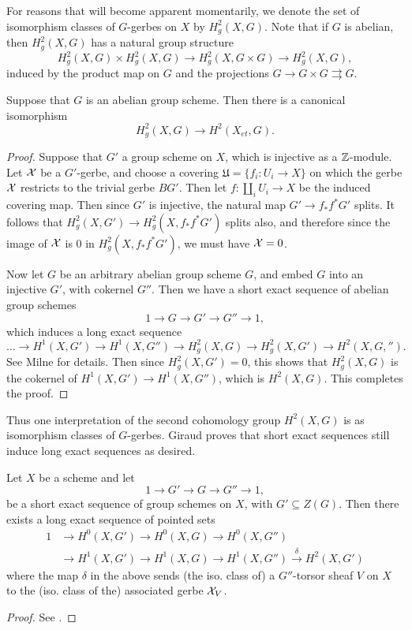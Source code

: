 For reasons that will become apparent momentarily, we denote the set of isomorphism classes of $G$-gerbes on $X$ by $H^2_g(X,G)$.  Note that if $G$ is abelian, then $H^2_g(X,G)$ has a natural group structure
$$H_g^2(X,G)\times H_g^2(X,G)\rightarrow H_g^2(X,G\times G)\rightarrow H_g^2(X,G),$$
induced by the product map on $G$ and the projections $G\rightarrow G\times G\rightrightarrows G$.
\begin{prop}
Suppose that $G$ is an abelian group scheme.  Then there is a canonical isomorphism
$$H^2_g(X,G)\rightarrow H^2(X_{et},G).$$
\end{prop}
\begin{proof}
Suppose that $G'$ a group scheme on $X$, which is injective as a $\mathbb{Z}$-module.  Let $\mathcal{X}$ be a $G'$-gerbe, and choose a covering $\mathfrak U=\{f_i: U_i\rightarrow X\}$ on which the gerbe $\mathcal{X}$ restricts to the trivial gerbe $BG'$.  Then let $f: \amalg_i U_i\rightarrow X$ be the induced covering map.  Then since $G'$ is injective, the natural map $G'\rightarrow f_*f^*G'$ splits.  It follows that $H^2_g(X,G')\rightarrow H^2_g(X,f_*f^*G')$ splits also, and therefore since the image of $\mathcal{X}$ is $0$ in $H^2_g(X,f_*f^*G')$, we must have $\mathcal{X} = 0$.

Now let $G$ be an arbitrary abelian group scheme $G$, and embed $G$ into an injective $G'$, with cokernel $G''$.  Then we have a short exact sequence of abelian group schemes
$$1\rightarrow G\rightarrow G'\rightarrow G''\rightarrow 1,$$
which induces a long exact sequence
$$\dots \rightarrow H^1(X,G')\rightarrow H^1(X,G'')\rightarrow H^2_g(X,G)\rightarrow H^2_g(X,G')\rightarrow H^2(X,G,'').$$
See Milne \cite{milne1980etale} for details.  Then since $H^2_g(X,G') = 0$, this shows that $H^2_g(X,G)$ is the cokernel of $H^1(X,G')\rightarrow H^1(X,G'')$, which is $H^2(X,G)$.  This completes the proof.
\end{proof}

Thus one interpretation of the second cohomology group $H^2(X,G)$ is as isomorphism classes of $G$-gerbes.  Giraud proves that short exact sequences still induce long exact sequences as desired.
\begin{lem}[Giraud]\label{giraurds lemma}
Let $X$ be a scheme and let
$$1\rightarrow G'\rightarrow G\rightarrow G''\rightarrow 1,$$
be a short exact sequence of group schemes on $X$, with $G'\subseteq Z(G)$.  Then there exists a long exact sequence of pointed sets
\begin{align*}
1 & \rightarrow H^0(X,G') \rightarrow H^0(X,G)\rightarrow H^0(X,G'')\\
  & \rightarrow H^1(X,G') \rightarrow H^1(X,G)\rightarrow H^1(X,G'')\xrightarrow{\delta} H^2(X,G')
\end{align*}
where the map $\delta$ in the above sends (the iso. class of) a $G''$-torsor sheaf $V$ on $X$ to the (iso. class of the) associated gerbe $\mathcal{X}_V$.
\end{lem}
\begin{proof}
See \cite{giraud1971cohomologie}.
\end{proof}

